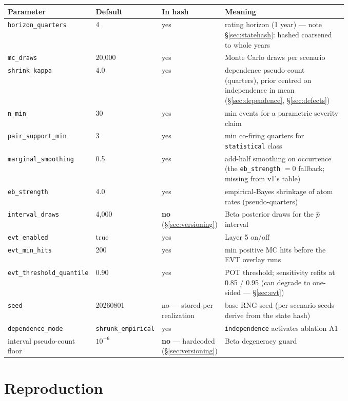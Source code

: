\documentclass[11pt]{article}
\begin{document}
\begin{center}\footnotesize
\begin{tabular}{@{}p{0.235\linewidth}lp{0.135\linewidth}p{0.40\linewidth}@{}}
\toprule
Parameter & Default & In hash & Meaning \\
\midrule
\texttt{horizon\_quarters} & 4 & yes & rating horizon (1 year) --- note \S\ref{sec:statehash}: hashed coarsened to whole years \\
\texttt{mc\_draws} & 20{,}000 & yes & Monte Carlo draws per scenario \\
\texttt{shrink\_kappa} & 4.0 & yes & dependence pseudo-count (quarters), prior centred on independence in mean (\S\ref{sec:dependence}, \S\ref{sec:defects}) \\
\texttt{n\_min} & 30 & yes & min events for a parametric severity claim \\
\texttt{pair\_support\_min} & 3 & yes & min co-firing quarters for \texttt{statistical} class \\
\texttt{marginal\_smoothing} & 0.5 & yes & add-half smoothing on occurrence (the \texttt{eb\_strength} $= 0$ fallback; missing from v1's table) \\
\texttt{eb\_strength} & 4.0 & yes & empirical-Bayes shrinkage of atom rates (pseudo-quarters) \\
\texttt{interval\_draws} & 4{,}000 & \textbf{no} (\S\ref{sec:versioning}) & Beta posterior draws for the $\hat p$ interval \\
\texttt{evt\_enabled} & true & yes & Layer 5 on/off \\
\texttt{evt\_min\_hits} & 200 & yes & min positive MC hits before the EVT overlay runs \\
\texttt{evt\_threshold\_quantile} & 0.90 & yes & POT threshold; sensitivity refits at 0.85 / 0.95 (can degrade to one-sided --- \S\ref{sec:evt}) \\
\texttt{seed} & 20260801 & no --- stored per realization & base RNG seed (per-scenario seeds derive from the state hash) \\
\texttt{dependence\_mode} & \texttt{shrunk\_empirical} & yes & \texttt{independence} activates ablation A1 \\
interval pseudo-count floor & $10^{-6}$ & \textbf{no} --- hardcoded (\S\ref{sec:versioning}) & Beta degeneracy guard \\
\bottomrule
\end{tabular}
\end{center}

\section{Reproduction}
\label{app:repro}
\end{document}
